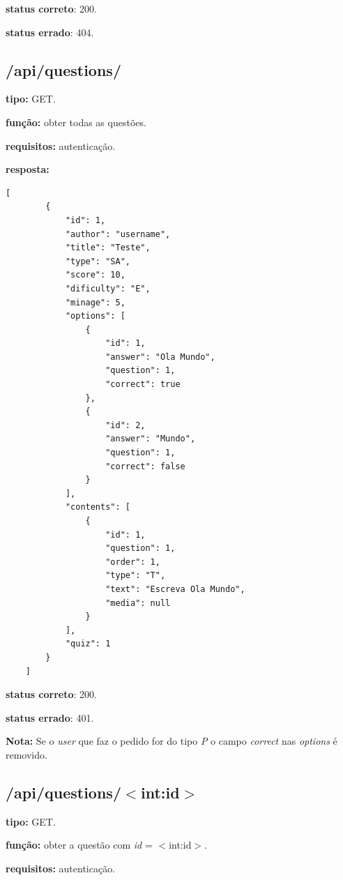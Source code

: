\documentclass[11pt,a4paper]{report}
\begin{document}
\textbf{status correto}: 200.

\textbf{status errado}: 404.

\newpage

\subsection{/api/questions/}

\textbf{tipo:} GET.

\textbf{função:} obter todas as questões.

\textbf{requisitos:} autenticação.

\textbf{resposta:}

\begin{lstlisting}[style = code]
    [
        {
            "id": 1,
            "author": "username",
            "title": "Teste",
            "type": "SA",
            "score": 10,
            "dificulty": "E",
            "minage": 5,
            "options": [
                {
                    "id": 1,
                    "answer": "Ola Mundo",
                    "question": 1,
                    "correct": true
                },
                {
                    "id": 2,
                    "answer": "Mundo",
                    "question": 1,
                    "correct": false
                }
            ],
            "contents": [
                {
                    "id": 1,
                    "question": 1,
                    "order": 1,
                    "type": "T",
                    "text": "Escreva Ola Mundo",
                    "media": null
                }
            ],
            "quiz": 1
        }
    ]
\end{lstlisting}

\textbf{status correto}: 200.

\textbf{status errado}: 401.

\textbf{Nota:} Se o \emph{user} que faz o pedido for do tipo \emph{P} o campo \emph{correct} nas \emph{options} é removido.

\newpage

\subsection{/api/questions/$<$int:id$>$}

\textbf{tipo:} GET.

\textbf{função:} obter a questão com \emph{id} = $<$int:id$>$.

\textbf{requisitos:} autenticação.
\end{document}
